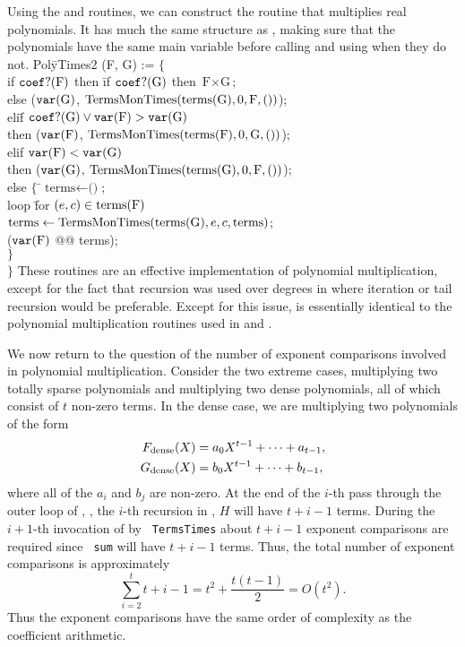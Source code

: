 Using the  and  routines, we can construct
the routine that multiplies real polynomials. It has much the same
structure as , making sure that the polynomials have
the same main variable before calling  and using
 when they do not.
\begindsacode
Pol\=yTimes2 (F, G) := $\{$ \\
\>if $\mathop{\tt coef?}\nolimits(\mbox{F})$ then \=if $\mathop{\tt coef?}\nolimits(\mbox{G})$ then $\mbox{F}\times\mbox{G}$; \\
\>\>else ($\mathop{\tt var}\nolimits(\mbox{G})$, $\mbox{TermsMonTimes}(\operatorname{terms}(\mbox{G}), 0, \mbox{F}, ())$); \\
\>eli\=f $\mathop{\tt coef?}\nolimits(\mbox{G}) \vee \mathop{\tt var}\nolimits(\mbox{F}) > \mathop{\tt var}\nolimits(\mbox{G})$\\
\>\> then ($\mathop{\tt var}\nolimits(\mbox{F})$, $\mbox{TermsMonTimes}(\operatorname{terms}(\mbox{F}), 0, \mbox{G}, ())$);\\
\>elif $\mathop{\tt var}\nolimits(\mbox{F}) < \mathop{\tt var}\nolimits(\mbox{G})$ \\
\>\>then ($\mathop{\tt var}\nolimits(\mbox{G})$, $\mbox{TermsMonTimes}(\operatorname{terms}(\mbox{G}), 0, \mbox{F}, ())$);\\
\>else $\{$ \=$\mbox{terms} \leftarrow \mbox{()}$;\\
\>\>loop \=for $(e, c) \in \operatorname{terms}(\mbox{F})$\\
\>\>\>$\mbox{terms} \leftarrow \mbox{TermsMonTimes}(\operatorname{terms}(\mbox{G}),
      e, c, \mbox{terms})$;\\
\>\> ($\mathop{\tt var}\nolimits(\mbox{F})$ @@ terms);\\
\>\>$\}$\\
\>$\}$
\enddsacode
These routines are an effective implementation of polynomial
multiplication, except for the fact that recursion was used over
degrees in  where iteration or tail recursion would
be preferable.  Except for this issue,  is essentially
identical to the polynomial multiplication routines used in
\Macsyma{} and \Axiom.


We now return to the question of the number of exponent comparisons
involved in polynomial multiplication.  Consider the two extreme
cases, multiplying two totally sparse polynomials and multiplying two
dense polynomials, all of which consist of $t$ non-zero terms. In the
dense case, we are multiplying two polynomials of the form
\[
\begin{aligned}
F_{\rm dense}(X) &= a_{0} X^{t-1} + \cdots + a_{t-1}, \\
G_{\rm dense}(X) &= b_{0} X^{t-1} + \cdots + b_{t-1},
\end{aligned}
\]
where all of the $a_i$ and $b_j$ are non-zero.  At the end of the
$i$-th pass through the outer loop of , \ie, the
$i$-th recursion in , $H$ will have $t+i-1$ terms.
During the $i+1$-th invocation of  by {\tt
TermsTimes} about $t+i-1$ exponent comparisons are required since {\tt
sum} will have $t+i-1$ terms.  Thus, the total number of exponent
comparisons is approximately
\[
\sum_{i=2}^{t} t + i - 1 = t^2 + \frac{t(t-1)}{2} = O(t^2).
\]
Thus the exponent comparisons have the same order of complexity as the
coefficient arithmetic.  

